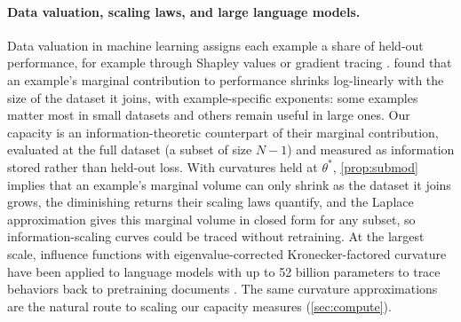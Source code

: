 \documentclass[10pt,twocolumn,letterpaper]{article}
\theoremstyle{definition}
\begin{document}
\paragraph{Data valuation, scaling laws, and large language models.} Data valuation in machine learning assigns each example a share of held-out performance, for example through Shapley values \citep{ghorbani2019} or gradient tracing \citep{pruthi2020}. \citet{covert2024} found that an example's marginal contribution to performance shrinks log-linearly with the size of the dataset it joins, with example-specific exponents: some examples matter most in small datasets and others remain useful in large ones. Our capacity is an information-theoretic counterpart of their marginal contribution, evaluated at the full dataset (a subset of size $N-1$) and measured as information stored rather than held-out loss. With curvatures held at $\theta^*$, \cref{prop:submod} implies that an example's marginal volume can only shrink as the dataset it joins grows, the diminishing returns their scaling laws quantify, and the Laplace approximation gives this marginal volume in closed form for any subset, so information-scaling curves could be traced without retraining. At the largest scale, influence functions with eigenvalue-corrected Kronecker-factored curvature have been applied to language models with up to 52 billion parameters to trace behaviors back to pretraining documents \citep{grosse2023}. The same curvature approximations are the natural route to scaling our capacity measures (\cref{sec:compute}).
\end{document}
